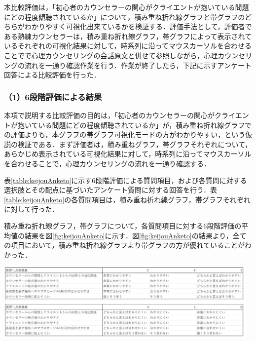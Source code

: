 \documentclass[shuuron]{kuee}
\begin{document}
本比較評価は，「初心者のカウンセラーの関心がクライエントが抱いている問題にどの程度傾聴されているか」について，積み重ね折れ線グラフと帯グラフのどちらがわかりやすく可視化出来ているかを検証する．評価手法として，評価者である熟練カウンセラーは，積み重ね折れ線グラフ，帯グラフによって表示されているそれぞれの可視化結果に対して，時系列に沿ってマウスカーソルを合わせることでで心理カウンセリングの会話原文と併せて参照しながら，心理カウンセリングの流れを一通り確認作業を行う．作業が終了したら，下記に示すアンケート回答による比較評価を行った．

\subsubsection{（1）6段階評価による結果}

本項で説明する比較評価の目的は，「初心者のカウンセラーの関心がクライエントが抱いている問題にどの程度傾聴されているか」が，積み重ね折れ線グラフでの評価よりも，本グラフの帯グラフ可視化モードの方がわかりやすい，という仮説の検証である．まず評価者は，積み重ねグラフ，帯グラフそれぞれについて，あらかじめ表示されている可視化結果に対して，時系列に沿ってマウスカーソルを合わせることで，心理カウンセリングの流れを一通り確認する．

表\ref{table:keijouAnketo}に示す6段階評価による質問項目，および各質問に対する選択肢とその配点に基づいたアンケート質問に対する回答を行う．表\ref{table:keijouAnketo}の各質問項目は，積み重ね折れ線グラフ，帯グラフそれぞれに対して行った．


積み重ね折れ線グラフ，帯グラフについて，各質問項目に対する6段階評価の平均値の結果を図\ref{fig:keijouAnketo}に示す．図\ref{fig:keijouAnketo}の結果より，全ての項目において，積み重ね折れ線グラフより帯グラフの方が優れていることがわかった．

\begin{table}
  \caption{可視化手法比較アンケートにおける6段階評価質問}
  \label{table:keijouAnketo}
  \begin{center}
    \includegraphics[clip,width=13.0cm]{point.png}
  \end{center}
\end{table}
\end{document}
